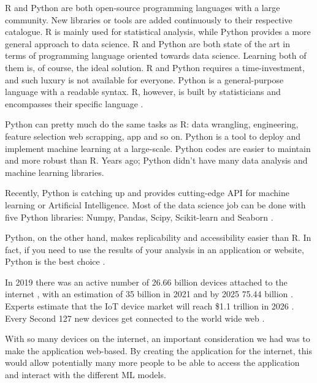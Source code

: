 	R and Python are both open-source programming languages with a large community. New libraries or tools are added continuously to their respective catalogue. R is mainly used for statistical analysis, while Python provides a more general approach to data science.
	R and Python are both state of the art in terms of programming language oriented towards data science. Learning both of them is, of course, the ideal solution. R and Python requires a time-investment, and such luxury is not available for everyone. Python is a general-purpose language with a readable syntax. R, however, is built by statisticians and encompasses their specific language \cite{r_vs_py}.
	
	Python can pretty much do the same tasks as R: data wrangling, engineering, feature selection web scrapping, app and so on. Python is a tool to deploy and implement machine learning at a large-scale. Python codes are easier to maintain and more robust than R. Years ago; Python didn't have many data analysis and machine learning libraries. 
	
	Recently, Python is catching up and provides cutting-edge API for machine learning or Artificial Intelligence. Most of the data science job can be done with five Python libraries: Numpy, Pandas, Scipy, Scikit-learn and Seaborn \cite{r_vs_py}.
	
	Python, on the other hand, makes replicability and accessibility easier than R. In fact, if you need to use the results of your analysis in an application or website, Python is the best choice \cite{r_vs_py}.
	
	In 2019 there was an active number of 26.66 billion devices attached to the internet \cite{securitytoday, statista_iot}, with an estimation of 35 billion in 2021 \cite{securitytoday} and by 2025 75.44 billion \cite{statista_iot}. Experts estimate that the IoT device market will reach \$1.1 trillion in 2026 \cite{securitytoday}. Every Second 127 new devices get connected to the world wide web \cite{securitytoday}.
	
	With so many devices on the internet, an important consideration we had was to make the application web-based. By creating the application for the internet, this would allow potentially many more people to be able to access the application and interact with the different ML models. 
	
